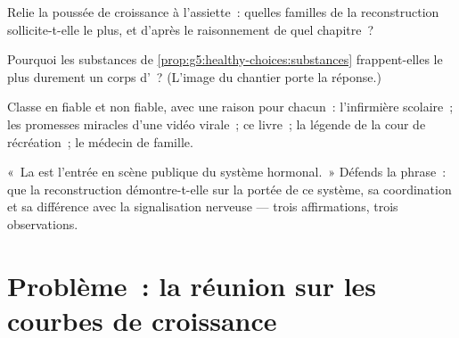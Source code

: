 \begin{exercise}[$\star\star$]\label{exo:g8:puberty:9}
Relie la poussée de croissance à l'assiette~: quelles familles de
 la reconstruction sollicite-t-elle le plus, et d'après le
raisonnement de quel chapitre~?
\end{exercise}

\begin{exercise}[$\star\star$]\label{exo:g8:puberty:10}
Pourquoi les substances de
\cref{prop:g5:healthy-choices:substances} frappent-elles le plus
durement un corps d'~? (L'image du chantier porte la
réponse.)
\end{exercise}

\begin{exercise}[$\star\star$]\label{exo:g8:puberty:11}
Classe en fiable et non fiable, avec une raison pour chacun~:
l'infirmière scolaire~; les promesses miracles d'une vidéo virale~;
ce livre~; la légende de la cour de récréation~; le médecin de
famille.
\end{exercise}

\begin{exercise}[$\star\star\star$]\label{exo:g8:puberty:12}
«~La  est l'entrée en scène publique du système
hormonal.~» Défends la phrase~: que la reconstruction
démontre-t-elle sur la portée de ce système, sa coordination et sa
différence avec la signalisation nerveuse --- trois affirmations,
trois observations.
\end{exercise}

\section{Problème~: la réunion sur les courbes de croissance}

